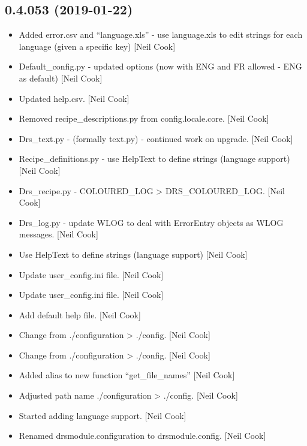 \documentclass[a4paper,10pt,english]{report}
\begin{document}
\subsection{0.4.053 (2019-01-22)}
\label{\detokenize{misc/changelog:id209}}\begin{itemize}
\item {} 
Added error.csv and “language.xls” - use language.xls to edit strings
for each language (given a specific key) {[}Neil Cook{]}

\item {} 
Default\_config.py - updated options (now with ENG and FR allowed - ENG
as default) {[}Neil Cook{]}

\item {} 
Updated help.csv. {[}Neil Cook{]}

\item {} 
Removed recipe\_descriptions.py from config.locale.core. {[}Neil Cook{]}

\item {} 
Drs\_text.py - (formally text.py) - continued work on upgrade. {[}Neil
Cook{]}

\item {} 
Recipe\_definitions.py - use HelpText to define strings (language
support) {[}Neil Cook{]}

\item {} 
Drs\_recipe.py - COLOURED\_LOG \textendash{}\textgreater{} DRS\_COLOURED\_LOG. {[}Neil Cook{]}

\item {} 
Drs\_log.py - update WLOG to deal with ErrorEntry objects as WLOG
messages. {[}Neil Cook{]}

\item {} 
Use HelpText to define strings (language support) {[}Neil Cook{]}

\item {} 
Update user\_config.ini file. {[}Neil Cook{]}

\item {} 
Update user\_config.ini file. {[}Neil Cook{]}

\item {} 
Add default help file. {[}Neil Cook{]}

\item {} 
Change from ./configuration \textendash{}\textgreater{} ./config. {[}Neil Cook{]}

\item {} 
Change from ./configuration \textendash{}\textgreater{} ./config. {[}Neil Cook{]}

\item {} 
Added alias to new function “get\_file\_names” {[}Neil Cook{]}

\item {} 
Adjusted path name ./configuration \textendash{}\textgreater{} ./config. {[}Neil Cook{]}

\item {} 
Started adding language support. {[}Neil Cook{]}

\item {} 
Renamed drsmodule.configuration to drsmodule.config. {[}Neil Cook{]}

\end{itemize}
\end{document}
